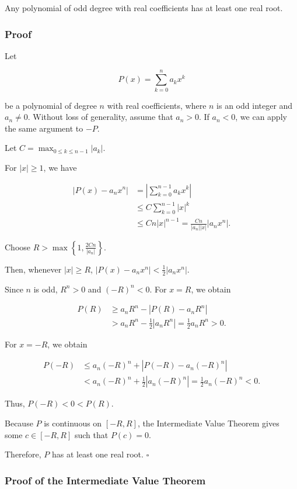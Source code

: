 \documentclass[11pt,a4paper]{article}
\begin{document}
Any polynomial of odd degree with real coefficients has at least one
real root.

\subsubsection{Proof}\label{proof}

Let

\[
P(x)=\sum_{k=0}^{n}a_kx^k
\]

be a polynomial of degree \(n\) with real coefficients, where \(n\) is
an odd integer and \(a_n\neq0\). Without loss of generality, assume that
\(a_n>0\). If \(a_n<0\), we can apply the same argument to \(-P\).

Let \(C=\max_{0\leq k\leq n-1}|a_k|.\)

For \(|x|\geq1\), we have

\[
\begin{aligned}
\left|P(x)-a_nx^n\right|
&=\left|\sum_{k=0}^{n-1}a_kx^k\right|\\
&\leq C\sum_{k=0}^{n-1}|x|^k\\
&\leq Cn|x|^{n-1}
=\frac{Cn}{|a_n||x|}|a_nx^n|.
\end{aligned}
\]

Choose \(R>\max\left\{1,\frac{2Cn}{|a_n|}\right\}.\)

Then, whenever \(|x|\geq R\),
\(\left|P(x)-a_nx^n\right|<\frac12|a_nx^n|.\)

Since \(n\) is odd, \(R^n>0\) and \((-R)^n<0\). For \(x=R\), we obtain

\[
\begin{aligned}
P(R)
&\geq a_nR^n-\left|P(R)-a_nR^n\right|\\
&>a_nR^n-\frac12|a_nR^n|
=\frac12a_nR^n>0.
\end{aligned}
\]

For \(x=-R\), we obtain

\[
\begin{aligned}
P(-R)
&\leq a_n(-R)^n+\left|P(-R)-a_n(-R)^n\right|\\
&<a_n(-R)^n+\frac12|a_n(-R)^n|
=\frac12a_n(-R)^n<0.
\end{aligned}
\]

Thus, \(P(-R)<0<P(R).\)

Because \(P\) is continuous on \([-R,R]\), the Intermediate Value
Theorem gives some \(c\in[-R,R]\) such that \(P(c)=0.\)

Therefore, \(P\) has at least one real root. \(\square\)

\subsubsection{Proof of the Intermediate Value
Theorem}\label{proof-of-the-intermediate-value-theorem}
\end{document}
